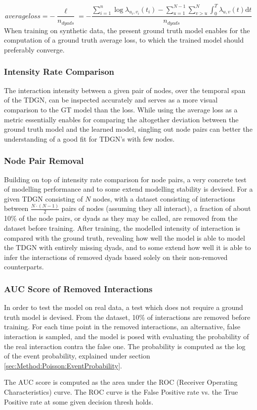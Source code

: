 \begin{equation}
   average loss = - \frac{\ell}{n_{dyads}} = - \frac{\sum_{i=1}^n \log \lambda_{u_i,v_i} (t_i) - \sum_{u=1}^{N-1} \sum_{v > u}^{N} \int_{0}^T \lambda_{u,v}(t) \mathrm{d} t}{n_{dyads}}
    \label{eq:LogLikelihoodFuncExplicit}
\end{equation}
When training on synthetic data, the present ground truth model enables for the computation of a ground truth average loss, to which the trained model should preferably converge.


\subsubsection{Intensity Rate Comparison}
\label{sec:Method:Evaluation:Intensity}
The interaction intensity between a given pair of nodes, over the temporal span of the TDGN, can be inspected accurately and serves as a more visual comparison to the GT model than the loss. 
While using the average loss as a metric essentially enables for comparing the altogether deviation between the ground truth model and the learned model, singling out node pairs can better the understanding of a good fit for TDGN's with few nodes.




\subsubsection{Node Pair Removal}
\label{sec:Method:Evaluation:NodePairRemoval}
Building on top of intensity rate comparison for node pairs, a very concrete test of modelling performance and to some extend modelling stability is devised.
For a given TDGN consisting of $N$ nodes, with a dataset consisting of interactions between $\frac{N\cdot(N-1)}{2}$ pairs of nodes (assuming they all interact), a fraction of about 10\% of the node pairs, or dyads as they may be called, are removed from the dataset before training.
After training, the modelled intensity of interaction is compared with the ground truth, revealing how well the model is able to model the TDGN with entirely missing dyads, and to some extend how well it is able to infer the interactions of removed dyads based solely on their non-removed counterparts.


\subsubsection{AUC Score of Removed Interactions}
\label{sec:Method:Evaluation:AUC}
In order to test the model on real data, a test which does not require a ground truth model is devised.
From the dataset, 10\% of interactions are removed before training.
For each time point in the removed interactions, an alternative, false interaction is sampled, and the model is posed with evaluating the probability of the real interaction contra the false one.
The probability is computed as the log of the event probability, explained under section \ref{sec:Method:Poisson:EventProbability}.

The AUC score is computed as the area under the ROC (Receiver Operating Characteristics) curve.
The ROC curve is the False Positive rate vs. the True Positive rate at some given decision thresh holds.




